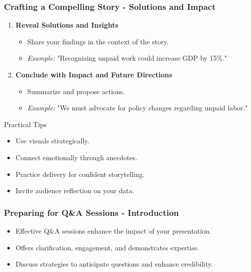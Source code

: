 \documentclass[aspectratio=169]{beamer}
\begin{document}
\begin{frame}[fragile]
    \frametitle{Crafting a Compelling Story - Solutions and Impact}
    \begin{enumerate}[resume]
        \item \textbf{Reveal Solutions and Insights}
            \begin{itemize}
                \item Share your findings in the context of the story.
                \item \textit{Example:} "Recognizing unpaid work could increase GDP by 15\%."
            \end{itemize}
        \item \textbf{Conclude with Impact and Future Directions}
            \begin{itemize}
                \item Summarize and propose actions.
                \item \textit{Example:} "We must advocate for policy changes regarding unpaid labor."
            \end{itemize}
    \end{enumerate}
    \begin{block}{Practical Tips}
        \begin{itemize}
            \item Use visuals strategically.
            \item Connect emotionally through anecdotes.
            \item Practice delivery for confident storytelling.
            \item Invite audience reflection on your data.
        \end{itemize}
    \end{block}
\end{frame}

\begin{frame}[fragile]
    \frametitle{Preparing for Q\&A Sessions - Introduction}
    \begin{itemize}
        \item Effective Q\&A sessions enhance the impact of your presentation.
        \item Offers clarification, engagement, and demonstrates expertise.
        \item Discuss strategies to anticipate questions and enhance credibility.
    \end{itemize}
\end{frame}
\end{document}
